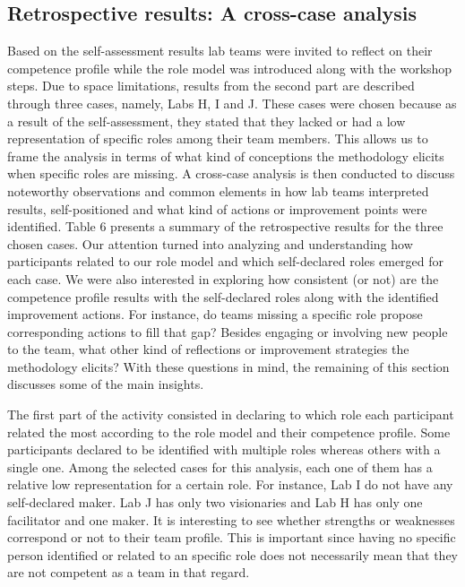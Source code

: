 \documentclass[AMA,STIX1COL,APA,STIX2COL]{WileyNJD-v2}
\begin{document}
\hypertarget{retrospective-results-a-cross-case-analysis}{%
\subsection{Retrospective results: A cross-case
analysis}\label{retrospective-results-a-cross-case-analysis}}

Based on the self-assessment results lab teams were invited to reflect
on their competence profile while the role model was introduced along
with the workshop steps. Due to space limitations, results from the
second part are described through three cases, namely, Labs H, I and J.
These cases were chosen because as a result of the self-assessment, they
stated that they lacked or had a low representation of specific roles
among their team members. This allows us to frame the analysis in terms
of what kind of conceptions the methodology elicits when specific roles
are missing. A cross-case analysis is then conducted to discuss
noteworthy observations and common elements in how lab teams interpreted
results, self-positioned and what kind of actions or improvement points
were identified. Table 6 presents a summary of the retrospective results
for the three chosen cases. Our attention turned into analyzing and
understanding how participants related to our role model and which
self-declared roles emerged for each case. We were also interested in
exploring how consistent (or not) are the competence profile results
with the self-declared roles along with the identified improvement
actions. For instance, do teams missing a specific role propose
corresponding actions to fill that gap? Besides engaging or involving
new people to the team, what other kind of reflections or improvement
strategies the methodology elicits? With these questions in mind, the
remaining of this section discusses some of the main insights.

The first part of the activity consisted in declaring to which role each
participant related the most according to the role model and their
competence profile. Some participants declared to be identified with
multiple roles whereas others with a single one. Among the selected
cases for this analysis, each one of them has a relative low
representation for a certain role. For instance, Lab I do not have any
self-declared maker. Lab J has only two visionaries and Lab H has only
one facilitator and one maker. It is interesting to see whether
strengths or weaknesses correspond or not to their team profile. This is
important since having no specific person identified or related to an
specific role does not necessarily mean that they are not competent as a
team in that regard.
\end{document}
